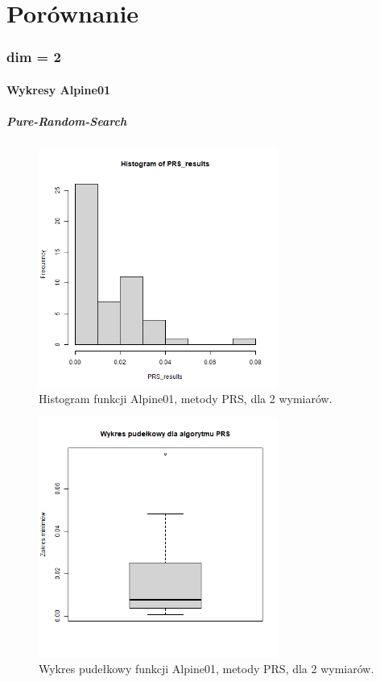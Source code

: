 \documentclass{lab}
\begin{document}
\newpage
\part{Porównanie}
\section{dim = 2}
\subsection{Wykresy Alpine01}
\subsubsection{Pure-Random-Search}
\begin{figure}[H]
  \centering
  \includegraphics[width=0.7\textwidth]{img/dim2_PRS_Alpine01_his.png}
  \caption{Histogram funkcji Alpine01, metody PRS, dla 2 wymiarów.}
\end{figure}
\begin{figure}[H]
  \centering
  \includegraphics[width=0.7\textwidth]{img/dim2_PRS_Alpine01.png}
  \caption{Wykres pudełkowy funkcji Alpine01, metody PRS, dla 2 wymiarów.}
\end{figure}
\end{document}
